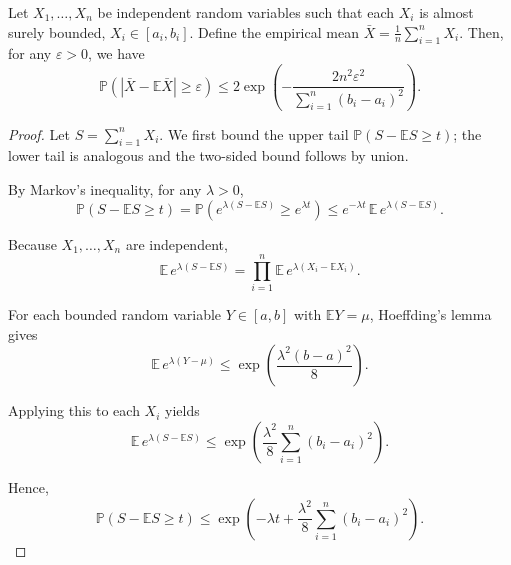 \documentclass[../main]{subfiles}
\begin{document}
\begin{theorem}
Let $X_1, \dots, X_n$ be independent random variables such that each $X_i$ is almost surely bounded, $X_i \in [a_i, b_i]$.  
Define the empirical mean $\bar{X} = \frac{1}{n}\sum_{i=1}^n X_i$. Then, for any $\varepsilon > 0$, we have
\begin{equation}
    \mathbb{P}\!\left(|\bar{X} - \mathbb{E}\bar{X}| \ge \varepsilon\right)
    \le 2\exp\!\left(-\frac{2n^2\varepsilon^2}{\sum_{i=1}^n (b_i - a_i)^2}\right).
\end{equation}
\end{theorem}
\begin{proof}
    Let $S = \sum_{i=1}^n X_i$. We first bound the upper tail $\mathbb{P}(S - \mathbb{E}S \ge t)$; the lower tail is analogous and the two-sided bound follows by union.
    
    By Markov's inequality, for any $\lambda > 0$,
    \begin{equation}
    \mathbb{P}(S - \mathbb{E}S \ge t)
    = \mathbb{P}\!\left(e^{\lambda(S - \mathbb{E}S)} \ge e^{\lambda t}\right)
    \le e^{-\lambda t}\,\mathbb{E}\,e^{\lambda(S - \mathbb{E}S)}.
    \end{equation}
    
    Because $X_1,\dots,X_n$ are independent,
    \begin{equation}
    \mathbb{E}\,e^{\lambda(S - \mathbb{E}S)}
    = \prod_{i=1}^n \mathbb{E}\,e^{\lambda(X_i - \mathbb{E}X_i)}.
    \end{equation}
    
    For each bounded random variable $Y \in [a,b]$ with $\mathbb{E}Y = \mu$, Hoeffding's lemma gives
    \begin{equation}
    \mathbb{E}\,e^{\lambda(Y - \mu)} \le \exp\!\left(\frac{\lambda^2(b - a)^2}{8}\right).
    \end{equation}
    
    Applying this to each $X_i$ yields
    \begin{equation}
    \mathbb{E}\,e^{\lambda(S - \mathbb{E}S)}
    \le \exp\!\left(\frac{\lambda^2}{8}\sum_{i=1}^n (b_i - a_i)^2\right).
    \end{equation}
    
    Hence,
    \begin{equation}
    \mathbb{P}(S - \mathbb{E}S \ge t)
    \le \exp\!\left(-\lambda t + \frac{\lambda^2}{8}\sum_{i=1}^n (b_i - a_i)^2\right).
    \end{equation}
    

\end{proof}
\end{document}
